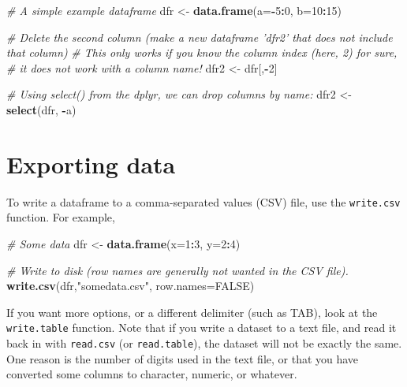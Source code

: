 \documentclass[]{book}
\newenvironment{Shaded}{\begin{snugshade}}{\end{snugshade}}
\newcommand{\CommentTok}[1]{\textcolor[rgb]{0.56,0.35,0.01}{\textit{#1}}}
\newcommand{\DataTypeTok}[1]{\textcolor[rgb]{0.13,0.29,0.53}{#1}}
\newcommand{\DecValTok}[1]{\textcolor[rgb]{0.00,0.00,0.81}{#1}}
\newcommand{\KeywordTok}[1]{\textcolor[rgb]{0.13,0.29,0.53}{\textbf{#1}}}
\newcommand{\NormalTok}[1]{#1}
\newcommand{\OperatorTok}[1]{\textcolor[rgb]{0.81,0.36,0.00}{\textbf{#1}}}
\newcommand{\OtherTok}[1]{\textcolor[rgb]{0.56,0.35,0.01}{#1}}
\newcommand{\StringTok}[1]{\textcolor[rgb]{0.31,0.60,0.02}{#1}}
\begin{document}
\begin{Shaded}
\begin{Highlighting}[]
\CommentTok{# A simple example dataframe}
\NormalTok{dfr <-}\StringTok{ }\KeywordTok{data.frame}\NormalTok{(}\DataTypeTok{a=}\OperatorTok{-}\DecValTok{5}\OperatorTok{:}\DecValTok{0}\NormalTok{, }\DataTypeTok{b=}\DecValTok{10}\OperatorTok{:}\DecValTok{15}\NormalTok{)}

\CommentTok{# Delete the second column (make a new dataframe 'dfr2' that does not include that column)}
\CommentTok{# This only works if you know the column index (here, 2) for sure,}
\CommentTok{# it does not work with a column name!}
\NormalTok{dfr2 <-}\StringTok{ }\NormalTok{dfr[,}\OperatorTok{-}\DecValTok{2}\NormalTok{]}

\CommentTok{# Using select() from the dplyr, we can drop columns by name:}
\NormalTok{dfr2 <-}\StringTok{ }\KeywordTok{select}\NormalTok{(dfr, }\OperatorTok{-}\NormalTok{a)}
\end{Highlighting}
\end{Shaded}

\hypertarget{exportingdata}{%
\section{Exporting data}\label{exportingdata}}

To write a dataframe to a comma-separated values (CSV) file, use the \texttt{write.csv} function. For example,

\begin{Shaded}
\begin{Highlighting}[]
\CommentTok{# Some data}
\NormalTok{dfr <-}\StringTok{ }\KeywordTok{data.frame}\NormalTok{(}\DataTypeTok{x=}\DecValTok{1}\OperatorTok{:}\DecValTok{3}\NormalTok{, }\DataTypeTok{y=}\DecValTok{2}\OperatorTok{:}\DecValTok{4}\NormalTok{)}

\CommentTok{# Write to disk (row names are generally not wanted in the CSV file).}
\KeywordTok{write.csv}\NormalTok{(dfr,}\StringTok{"somedata.csv"}\NormalTok{, }\DataTypeTok{row.names=}\OtherTok{FALSE}\NormalTok{)}
\end{Highlighting}
\end{Shaded}

If you want more options, or a different delimiter (such as TAB), look at the \texttt{write.table} function. Note that if you write a dataset to a text file, and read it back in with \texttt{read.csv} (or \texttt{read.table}), the dataset will not be exactly the same. One reason is the number of digits used in the text file, or that you have converted some columns to character, numeric, or whatever.
\end{document}
